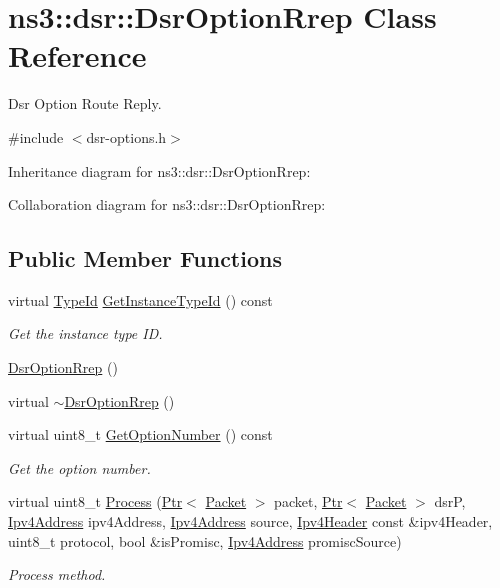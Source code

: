 \hypertarget{classns3_1_1dsr_1_1DsrOptionRrep}{}\section{ns3\+:\+:dsr\+:\+:Dsr\+Option\+Rrep Class Reference}
\label{classns3_1_1dsr_1_1DsrOptionRrep}


Dsr Option Route Reply.  




{\ttfamily \#include $<$dsr-\/options.\+h$>$}



Inheritance diagram for ns3\+:\+:dsr\+:\+:Dsr\+Option\+Rrep\+:


Collaboration diagram for ns3\+:\+:dsr\+:\+:Dsr\+Option\+Rrep\+:
\subsection*{Public Member Functions}
\begin{DoxyCompactItemize}
\item 
virtual \hyperlink{classns3_1_1TypeId}{Type\+Id} \hyperlink{classns3_1_1dsr_1_1DsrOptionRrep_a530843a582a10b60c894c5da10f6fdef}{Get\+Instance\+Type\+Id} () const 
\begin{DoxyCompactList}\small\item\em Get the instance type ID. \end{DoxyCompactList}\item 
\hyperlink{classns3_1_1dsr_1_1DsrOptionRrep_a6db903f7b41a1c66f756950b53b558e0}{Dsr\+Option\+Rrep} ()
\item 
virtual \hyperlink{classns3_1_1dsr_1_1DsrOptionRrep_ada9b256541b3cd4d352bbe3ebc10f909}{$\sim$\+Dsr\+Option\+Rrep} ()
\item 
virtual uint8\+\_\+t \hyperlink{classns3_1_1dsr_1_1DsrOptionRrep_ad96484656808d0a622d34aa23c1f2330}{Get\+Option\+Number} () const 
\begin{DoxyCompactList}\small\item\em Get the option number. \end{DoxyCompactList}\item 
virtual uint8\+\_\+t \hyperlink{classns3_1_1dsr_1_1DsrOptionRrep_a79ff29fe60c7c62ac99ca0da8c0a820f}{Process} (\hyperlink{classns3_1_1Ptr}{Ptr}$<$ \hyperlink{classns3_1_1Packet}{Packet} $>$ packet, \hyperlink{classns3_1_1Ptr}{Ptr}$<$ \hyperlink{classns3_1_1Packet}{Packet} $>$ dsrP, \hyperlink{classns3_1_1Ipv4Address}{Ipv4\+Address} ipv4\+Address, \hyperlink{classns3_1_1Ipv4Address}{Ipv4\+Address} source, \hyperlink{classns3_1_1Ipv4Header}{Ipv4\+Header} const \&ipv4\+Header, uint8\+\_\+t protocol, bool \&is\+Promisc, \hyperlink{classns3_1_1Ipv4Address}{Ipv4\+Address} promisc\+Source)
\begin{DoxyCompactList}\small\item\em Process method. \end{DoxyCompactList}\end{DoxyCompactItemize}

